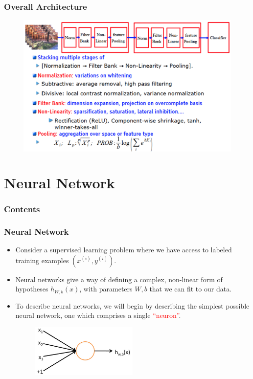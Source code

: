 \documentclass{beamer}
\newcommand{\tr}[1]{\textcolor{red}{#1}} %
\begin{document}
{\begin{frame}
\frametitle{Overall Architecture}
\begin{figure}
      \includegraphics[width=1\textwidth]{figs/intro15.png}
\end{figure}
\end{frame}
}

\section{Neural Network}

\begin{frame}
  \frametitle{Contents}
  \tableofcontents[currentsection]
\end{frame}

\begin{frame}
\frametitle{Neural Network}
\begin{itemize}
\item Consider a supervised learning problem where we have access to labeled training examples $(x^{(i)}, y^{(i)})$.
\item Neural networks give a way of defining a complex, non-linear form of hypotheses $h_{W,b}(x)$, with parameters $W, b$ that we can fit to our data.
\item To describe neural networks, we will begin by describing the simplest possible neural network, one which comprises a single \tr{``neuron''}. 

\begin{figure}
      \includegraphics[height=2.6cm]{figs/SingleNeuron.png}
\end{figure}


\end{itemize}
\end{frame}
\end{document}
